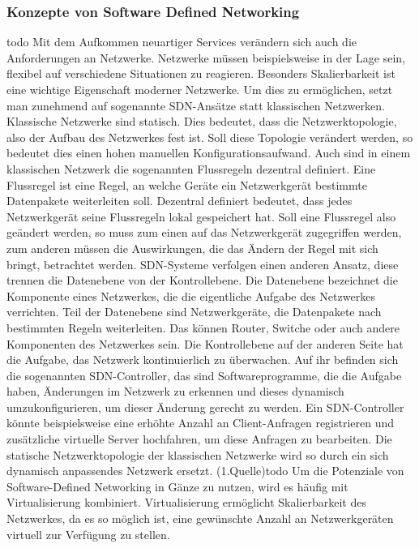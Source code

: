 \subsubsection{Konzepte von Software Defined Networking}

todo
Mit dem Aufkommen neuartiger Services verändern sich auch die Anforderungen an Netzwerke. Netzwerke müssen beispielsweise in der Lage sein, flexibel auf verschiedene Situationen zu reagieren. 
Besonders Skalierbarkeit ist eine wichtige Eigenschaft moderner Netzwerke. Um dies zu ermöglichen, setzt man zunehmend auf sogenannte \ac{SDN}-Ansätze statt klassischen Netzwerken. 
Klassische Netzwerke sind statisch. Dies bedeutet, dass die Netzwerktopologie, also der Aufbau des Netzwerkes fest ist. Soll diese Topologie verändert werden, so bedeutet dies einen hohen manuellen Konfigurationsaufwand. 
Auch sind in einem klassischen Netzwerk die sogenannten Flussregeln dezentral definiert. Eine Flussregel ist eine Regel, an welche Geräte ein Netzwerkgerät bestimmte Datenpakete weiterleiten soll. 
Dezentral definiert bedeutet, dass jedes Netzwerkgerät seine Flussregeln lokal gespeichert hat. Soll eine Flussregel also geändert werden, so muss zum einen auf das Netzwerkgerät zugegriffen werden, 
zum anderen müssen die Auswirkungen, die das Ändern der Regel mit sich bringt, betrachtet werden. \ac{SDN}-Systeme verfolgen einen anderen Ansatz, diese trennen die Datenebene von der Kontrollebene. 
Die Datenebene bezeichnet die Komponente eines Netzwerkes, die die eigentliche Aufgabe des Netzwerkes verrichten. Teil der Datenebene sind Netzwerkgeräte, die Datenpakete nach bestimmten Regeln weiterleiten. 
Das können Router, Switche oder auch andere Komponenten des Netzwerkes sein. Die Kontrollebene auf der anderen Seite hat die Aufgabe, das Netzwerk kontinuierlich zu überwachen. 
Auf ihr befinden sich die sogenannten SDN-Controller, das sind Softwareprogramme, die die Aufgabe haben, Änderungen im Netzwerk zu erkennen und dieses dynamisch umzukonfigurieren, um dieser Änderung gerecht zu werden. 
Ein SDN-Controller könnte beispielsweise eine erhöhte Anzahl an Client-Anfragen registrieren und zusätzliche virtuelle Server hochfahren, um diese Anfragen zu bearbeiten. 
Die statische Netzwerktopologie der klassischen Netzwerke wird so durch ein sich dynamisch anpassendes Netzwerk ersetzt. (1.Quelle)todo Um die Potenziale von Software-Defined Networking in Gänze zu nutzen, 
wird es häufig mit Virtualisierung kombiniert. Virtualisierung ermöglicht Skalierbarkeit des Netzwerkes, da es so möglich ist, eine gewünschte Anzahl an Netzwerkgeräten virtuell zur Verfügung zu stellen. 
